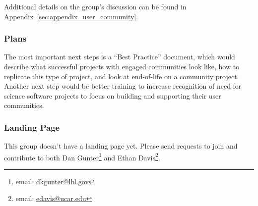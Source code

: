 Additional details on the group's discussion can be found in
Appendix~\ref{sec:appendix_user_community}.

\subsubsection{Plans}

The most important next steps is a ``Best Practice'' document, which would
describe what successful projects with engaged communities look like, how to
replicate this type of project, and look at end-of-life on a community project.
Another next step would be better training to increase recognition of need for science software
projects to focus on building and supporting their user communities.

\subsubsection{Landing Page}

This group doesn't have a landing page yet. Please send requests to join and contribute to both
Dan Gunter\footnote{email: \href{mailto:dkgunter@lbl.gov}{dkgunter@lbl.gov}} and Ethan Davis\footnote{email: \href{mailto:edavis@ucar.edu}{edavis@ucar.edu}}.
